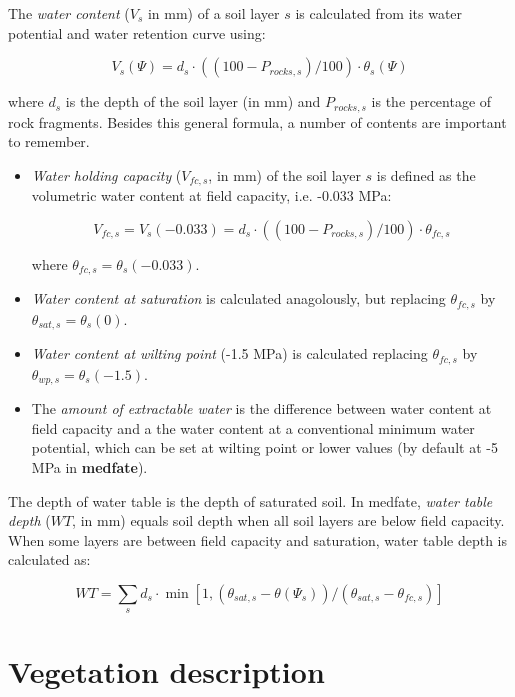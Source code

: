 \documentclass[]{book}
\providecommand{\tightlist}{%
  \setlength{\itemsep}{0pt}\setlength{\parskip}{0pt}}
\begin{document}
The \emph{water content} (\(V_s\) in mm) of a soil layer \(s\) is
calculated from its water potential and water retention curve using:

\begin{equation}
V_s(\Psi) = d_s\cdot ((100-P_{rocks,s})/100)\cdot\theta_{s}(\Psi)
\end{equation}

where \(d_s\) is the depth of the soil layer (in mm) and \(P_{rocks,s}\)
is the percentage of rock fragments. Besides this general formula, a
number of contents are important to remember.

\begin{itemize}
\tightlist
\item
  \emph{Water holding capacity} (\(V_{fc, s}\), in mm) of the soil layer
  \(s\) is defined as the volumetric water content at field capacity,
  i.e. -0.033 MPa:

  \begin{equation}
  V_{fc,s} = V_{s}(-0.033) = d_s\cdot ((100-P_{rocks,s})/100)\cdot\theta_{fc,s}
  \end{equation}

  where \(\theta_{fc,s} = \theta_s(-0.033)\).
\item
  \emph{Water content at saturation} is calculated anagolously, but
  replacing \(\theta_{fc,s}\) by \(\theta_{sat, s} = \theta_s(0)\).
\item
  \emph{Water content at wilting point} (-1.5 MPa) is calculated
  replacing \(\theta_{fc,s}\) by \(\theta_{wp,s} = \theta_s(-1.5)\).
\item
  The \emph{amount of extractable water} is the difference between water
  content at field capacity and a the water content at a conventional
  minimum water potential, which can be set at wilting point or lower
  values (by default at -5 MPa in \textbf{medfate}).
\end{itemize}

The depth of water table is the depth of saturated soil. In medfate,
\emph{water table depth} (\(WT\), in mm) equals soil depth when all soil
layers are below field capacity. When some layers are between field
capacity and saturation, water table depth is calculated as:

\begin{equation}
WT = \sum_{s}{d_s \cdot \min\left[1,(\theta_{sat,s} - \theta(\Psi_s))/(\theta_{sat,s}-\theta_{fc,s})\right]}
\end{equation}

\section{Vegetation description}\label{vegetation-description}
\end{document}

